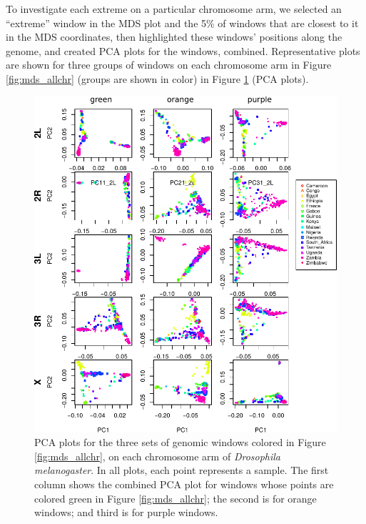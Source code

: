 \documentclass[11pt, oneside]{article}   	%
\begin{document}
To investigate each extreme on a particular chromosome arm, 
we selected an ``extreme'' window in the MDS plot
and the 5\% of windows that are closest to it in the MDS coordinates,
then highlighted these windows' positions along the genome,
and created PCA plots for the windows, combined.
Representative plots are shown for three groups of windows on each chromosome arm
in Figure \ref{fig:mds_allchr} (groups are shown in color)
in Figure \ref{fig:pca_by_pop} (PCA plots).


\begin{figure}
    \begin{center}
       \includegraphics[width=1\textwidth]{Fig2_pca_plots_allchr_3peaks_label_update}
    \end{center}
    \caption{      
        PCA plots for the three sets of genomic windows colored in Figure \ref{fig:mds_allchr},
        on each chromosome arm of \textit{Drosophila melanogaster}.
        In all plots, each point represents a sample. 
        The first column shows the combined PCA plot for windows 
        whose points are colored green in Figure \ref{fig:mds_allchr}; 
        the second is for orange windows; 
        and third is for purple windows.
         \label{fig:pca_by_pop}
    }
\end{figure}
\end{document}
